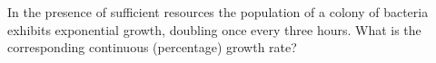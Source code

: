 \begin{activity}\label{A:0.4.4}

	In the presence of sufficient resources the population of a colony of bacteria exhibits exponential growth, doubling once every three hours. What is the corresponding continuous (percentage) growth rate?

\end{activity}\aftera
